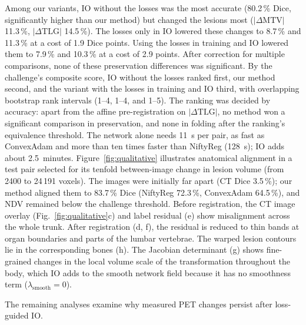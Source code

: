 Among our variants, IO without the losses was the most accurate (80.2\,\% Dice, significantly higher than our method) but changed the lesions most ($|\Delta\mathrm{MTV}|$ 11.3\,\%, $|\Delta\mathrm{TLG}|$ 14.5\,\%).
The losses only in IO lowered these changes to 8.7\,\% and 11.3\,\% at a cost of 1.9 Dice points.
Using the losses in training and IO lowered them to 7.9\,\% and 10.3\,\% at a cost of 2.9 points.
After correction for multiple comparisons, none of these preservation differences was significant.
By the challenge's composite score, IO without the losses ranked first, our method second, and the variant with the losses in training and IO third, with overlapping bootstrap rank intervals (1--4, 1--4, and 1--5).
The ranking was decided by accuracy: apart from the affine pre-registration on $|\Delta\mathrm{TLG}|$, no method won a significant comparison in preservation, and none in folding after the ranking's equivalence threshold.
The network alone needs 11~s per pair, as fast as ConvexAdam and more than ten times faster than NiftyReg (128~s); IO adds about 2.5~minutes.
Figure~\ref{fig:qualitative} illustrates anatomical alignment in a test pair selected for its tenfold between-image change in lesion volume (from 2400 to 24\,191 voxels).
The images were initially far apart (CT Dice 3.5\,\%); our method aligned them to 83.7\,\% Dice (NiftyReg 72.3\,\%, ConvexAdam 64.5\,\%), and NDV remained below the challenge threshold.
Before registration, the CT image overlay (Fig.~\ref{fig:qualitative}c) and label residual (e) show misalignment across the whole trunk.
After registration (d, f), the residual is reduced to thin bands at organ boundaries and parts of the lumbar vertebrae.
The warped lesion contours lie in the corresponding bones (h).
The Jacobian determinant (g) shows fine-grained changes in the local volume scale of the transformation throughout the body, which IO adds to the smooth network field because it has no smoothness term ($\lambda_{\mathrm{smooth}}=0$).




The remaining analyses examine why measured PET changes persist after loss-guided IO.

